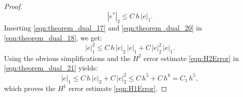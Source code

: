 \begin{proof}
  \begin{equation}
    |e^* |_2 \leq C \, h \, | e |_1 .
    \label{eqn:theorem_dual_20}
  \end{equation}
  Inserting \eqref{eqn:theorem_dual_17} and \eqref{eqn:theorem_dual_20}  in
  \eqref{eqn:theorem_dual_18}, we get:
  \begin{equation}
    |e|_1^2 \leq C \, h \, | e |_2 \, | e |_1 + C \, | e |_2^2 \, | e |_1 .
    \label{eqn:theorem_dual_21}
  \end{equation}
  Using the obvious simplifications and the $H^2$ error estimate
  \eqref{eqn:H2Error} in \eqref{eqn:theorem_dual_21} yields:
  \begin{equation}
    |e|_1 \leq C \, h \, | e |_2 + C \, | e |_2^2 \leq C \, h^5 + C \, h^8
      = C_1 \, h^5 ,
    \label{eqn:theorem_dual_22}
  \end{equation}
  which proves the $H^1$ error estimate \eqref{eqn:H1Error}.
\end{proof}
